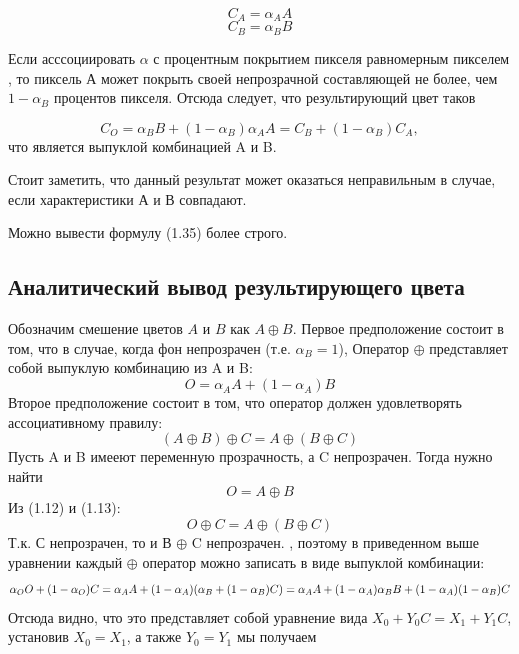 \begin{equation}
C_{A} = \alpha_{A}A 
\end{equation}
\begin{equation}
C_{B} = \alpha_{B}B
\end{equation}

Если асссоциировать $\alpha$ с процентным покрытием пикселя равномерным пикселем \cite{bib1}, то пиксель А может покрыть своей непрозрачной составляющей не более, чем $1- \alpha_{B}$ процентов пикселя.  Отсюда следует, что результирующий цвет таков

\begin{equation}
C_{O} = \alpha_{B}B + (1- \alpha_{B})\alpha_{A}A = C_{B} + (1- \alpha_{B})C_{A},
\end{equation}
что является выпуклой комбинацией A и B.


Стоит заметить, что данный результат может оказаться неправильным в случае, если характеристики  А и В совпадают.  

Можно вывести формулу (1.35) более строго. 

\subsection{Аналитический вывод результирующего цвета}
Обозначим смешение цветов $A$ и $B$ как $A \oplus B$. 
Первое предположение состоит в том, что в случае, когда фон непрозрачен (т.е. $\alpha _ {B} = 1$), Оператор $\oplus$ представляет собой выпуклую комбинацию из A и B:
\begin{equation}
O= \alpha_{A}A + (1- \alpha_{A})B
\end{equation}
Второе предположение состоит в том, что оператор должен удовлетворять ассоциативному правилу:
\begin{equation}
(A \oplus B) \oplus C = A \oplus (B \oplus C)
\end{equation}
Пусть A и B имееют переменную прозрачность, а C непрозрачен. Тогда нужно найти
\begin{equation}
O = A \oplus B
\end{equation}
Из (1.12) и (1.13):
\begin{equation}
O \oplus C = A \oplus (B \oplus C)
\end{equation}
Т.к. С непрозрачен, то и В $\oplus$ C непрозрачен. , поэтому в приведенном выше уравнении каждый  $\oplus$ оператор можно записать в виде выпуклой комбинации:
\begin{equation}
\alpha_{O}O + (1 - \alpha_{O}) C = \alpha_{A}A + (1 - \alpha_{A})(\alpha_{B} + (1 - \alpha_{B})C) \\
= \alpha_{A}A + (1 - \alpha_{A})\alpha_{B}B + (1-\alpha_{A})(1-\alpha_{B})C
\end{equation}
Отсюда видно, что это представляет собой уравнение вида $ X_{0} + Y_{0} C = X_{1} + Y_{1} C$, установив  $X_{0} = X_{1}$, а также $Y_{0} = Y_ {1}$ мы получаем

